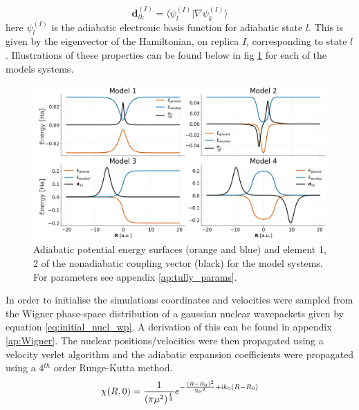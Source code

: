 \begin{equation}
  \mathbf{d}_{lk}^{(I)} = \langle \psi_{l}^{(I)} | \nabla \psi_k^{(I)} \rangle
  \label{eq:NACV_def}
\end{equation}
here $\psi_{l}^{(I)}$ is the adiabatic electronic basis function for adiabatic state $l$. This is given by the eigenvector of the Hamiltonian, on replica $I$, corresponding to state $l$. Illustrations of these  properties can be found below in fig \ref{fig:tully_schematics} for each of the  models systems.
\begin{figure}[H]
  \includegraphics[width=\textwidth]{../Chapter_tullyModels/model_schematics_review.png}
  \caption{\label{fig:tully_schematics}Adiabatic potential energy surfaces (orange and blue) and element 1, 2 of the nonadiabatic coupling vector (black) for the  model systems. For parameters see appendix \ref{ap:tully_params}.}
\end{figure}
\newpage
\noindent In order to initialise the simulations coordinates and velocities were sampled from the Wigner phase-space distribution of a gaussian nuclear wavepackets given by equation \eqref{eq:initial_nucl_wp}. A derivation of this can be found in appendix \ref{ap:Wigner}. The nuclear positions/velocities were then propagated using a velocity verlet algorithm and the adiabatic expansion coefficients were propagated using a 4$^{th}$ order Runge-Kutta method.
\begin{equation}
  \chi(R, 0) = \frac{1}{(\pi \mu^2)^{\frac{1}{4}}} e^{-\frac{(R - R_0)^2}{2 \mu^2} + \mathrm{i} k_0 (R - R_0) }
  \label{eq:initial_nucl_wp}
\end{equation}

